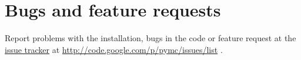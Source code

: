 
\hypertarget{bugs-and-feature-requests}{}
\section*{Bugs and feature requests}
\label{bugs-and-feature-requests}

Report problems with the installation, bugs in the code or feature request at
the \href{http://code.google.com/p/pymc/issues/list.}{issue tracker} at \href{http://code.google.com/p/pymc/issues/list}{http://code.google.com/p/pymc/issues/list} .

